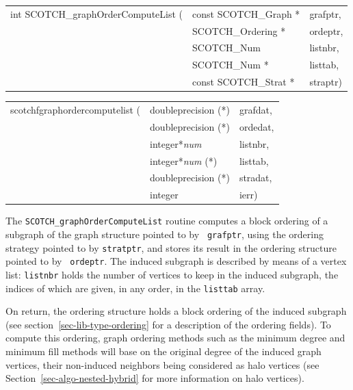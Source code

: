 \begin{itemize}
\progsyn

{\tt\begin{tabular}{l@{}ll}
int SCOTCH\_graphOrderComputeList ( & const SCOTCH\_Graph * & grafptr, \\
                                    & SCOTCH\_Ordering *    & ordeptr, \\
                                    & SCOTCH\_Num           & listnbr, \\
                                    & SCOTCH\_Num *         & listtab, \\
                                    & const SCOTCH\_Strat * & straptr)
\end{tabular}}

{\tt\begin{tabular}{l@{}ll}
scotchfgraphordercomputelist ( & doubleprecision (*)   & grafdat, \\
                               & doubleprecision (*)   & ordedat, \\
                               & integer*{\it num}     & listnbr, \\
                               & integer*{\it num} (*) & listtab, \\
                               & doubleprecision (*)   & stradat, \\
                               & integer               & ierr)
\end{tabular}}

\progdes

The {\tt SCOTCH\_graphOrderComputeList} routine computes a block
ordering of a subgraph of the graph structure pointed to by {\tt
grafptr}, using the ordering strategy pointed to by {\tt stratptr},
and stores its result in the ordering structure pointed to by {\tt
ordeptr}. The induced subgraph is described by means of a vertex
list: {\tt listnbr} holds the number of vertices to keep in the
induced subgraph, the indices of which are given, in any order,
in the {\tt listtab} array.

On return, the ordering structure holds a block ordering of the
induced subgraph (see section~\ref{sec-lib-type-ordering} for a
description of the ordering fields). To compute this ordering, graph
ordering methods such as the minimum degree and minimum fill methods
will base on the original degree of the induced graph vertices, their
non-induced neighbors being considered as halo vertices (see
Section~\ref{sec-algo-nested-hybrid} for more information on halo
vertices).


\end{itemize}

